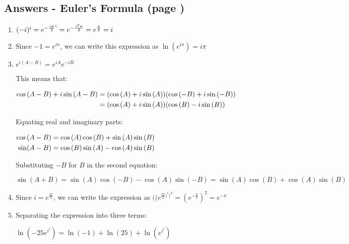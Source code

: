 \documentclass[../main.tex]{subfiles}
\begin{document}
\subsection*{Answers - Euler's Formula (page \pageref{eulersformula})}
\label{Eulers answers}
\begin{spacing}{1.5}
\begin{enumerate}
    \item 
    \((-i)^i=e^{-\frac{i\pi}{2}^{i}}\\
    =e^{-\frac{i^2 \pi}{2}}\\
    =e^{\frac{\pi}{2}}=i\)

    \item 
    Since \(-1=e^{i \pi}\), we can write this expression as \(\ln{(e^{i \pi})}=i \pi\)

    \item 
    \(e^{i(A-B)}=e^{iA}e^{-iB}\)

    This means that:

    $
    \!
    \begin{aligned}[t]
    \cos{(A-B)+i\sin{(A-B)}}
    &=(\cos{(A)+i\sin{(A)}})(\cos{(-B)+i\sin{(-B)}})\\
    &=(\cos{(A)+i\sin{(A)}})(\cos{(B)-i\sin{(B)}})
    \end{aligned}\\
    $
    
    Equating real and imaginary parts:

    $
    \!
    \begin{aligned}[t]
    \cos{(A-B)}
    &=\cos{(A)}\cos{(B)}+\sin{(A)}\sin{(B)}\\
    \sin(A-B)
    &=\cos{(B)}\sin{(A)}-\cos{(A)}\sin{(B)}\\
    \end{aligned}\\
    $

    Substituting \(-B\) for \(B\) in the second equation:

    \(\sin{(A+B)}=\sin{(A)}\cos{(-B)}-\cos{(A)}\sin{(-B)}=\sin{(A)}\cos{(B)}+\cos{(A)}\sin{(B)}\)

    \item 
    Since \(i=e^{\frac{i \pi}{2}}\), we can write the expression as \(((e^{\frac{i \pi}{2})^i)^2}=(e^{-\frac{\pi}{2}})^2=e^{-\pi}\)

    \item 
    Separating the expression into three terms:

    \(\ln{(-25e^{i^{i}})}=\ln(-1)+\ln(25)+\ln(e^{i^{i}})\)


\end{enumerate}
\end{spacing}
\end{document}

